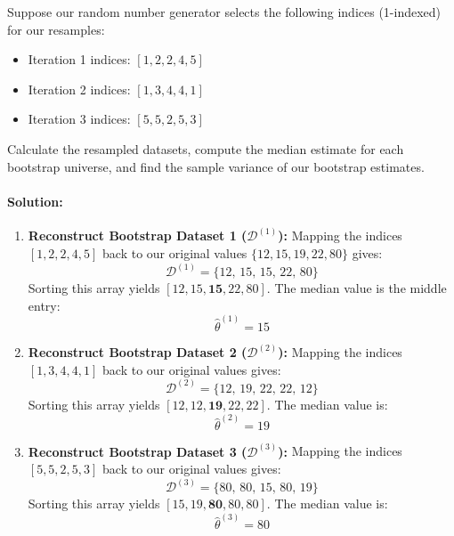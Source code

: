 \documentclass{article}
\begin{document}
Suppose our random number generator selects the following indices (1-indexed) for our resamples:
\begin{itemize}
    \item Iteration 1 indices: $[1, 2, 2, 4, 5]$
    \item Iteration 2 indices: $[1, 3, 4, 4, 1]$
    \item Iteration 3 indices: $[5, 5, 2, 5, 3]$
\end{itemize}
Calculate the resampled datasets, compute the median estimate for each bootstrap universe, and find the sample variance of our bootstrap estimates.

\paragraph{Solution:}
\begin{enumerate}
    \item \textbf{Reconstruct Bootstrap Dataset 1 ($\mathcal{D}^{(1)}$):}
    Mapping the indices $[1, 2, 2, 4, 5]$ back to our original values $\{12, 15, 19, 22, 80\}$ gives:
    \begin{equation}
    \mathcal{D}^{(1)} = \{12, \, 15, \, 15, \, 22, \, 80\}
    \end{equation}
    Sorting this array yields $[12, 15, \mathbf{15}, 22, 80]$. The median value is the middle entry:
    \begin{equation}
    \hat{\theta}^{(1)} = 15
    \end{equation}
    
    \item \textbf{Reconstruct Bootstrap Dataset 2 ($\mathcal{D}^{(2)}$):}
    Mapping the indices $[1, 3, 4, 4, 1]$ back to our original values gives:
    \begin{equation}
    \mathcal{D}^{(2)} = \{12, \, 19, \, 22, \, 22, \, 12\}
    \end{equation}
    Sorting this array yields $[12, 12, \mathbf{19}, 22, 22]$. The median value is:
    \begin{equation}
    \hat{\theta}^{(2)} = 19
    \end{equation}
    
    \item \textbf{Reconstruct Bootstrap Dataset 3 ($\mathcal{D}^{(3)}$):}
    Mapping the indices $[5, 5, 2, 5, 3]$ back to our original values gives:
    \begin{equation}
    \mathcal{D}^{(3)} = \{80, \, 80, \, 15, \, 80, \, 19\}
    \end{equation}
    Sorting this array yields $[15, 19, \mathbf{80}, 80, 80]$. The median value is:
    \begin{equation}
    \hat{\theta}^{(3)} = 80
    \end{equation}
    

\end{enumerate}
\end{document}
